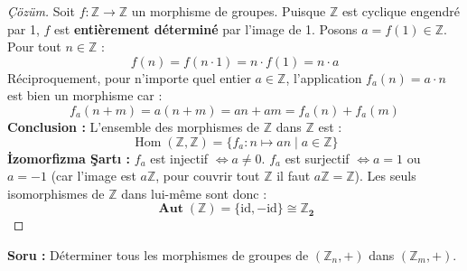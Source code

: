\documentclass[12pt,a4paper]{report}
\begin{document}
\begin{proof}[Çözüm]
Soit $f : \mathbb{Z} \to \mathbb{Z}$ un morphisme de groupes.  
Puisque $\mathbb{Z}$ est cyclique engendré par 1, $f$ est \textbf{entièrement déterminé} par l'image de 1.  
Posons $a = f(1) \in \mathbb{Z}$.  
Pour tout $n \in \mathbb{Z}$ :
\[ f(n) = f(n \cdot 1) = n \cdot f(1) = n \cdot a \]
Réciproquement, pour n'importe quel entier $a \in \mathbb{Z}$, l'application $f_a(n) = a \cdot n$ est bien un morphisme car :
\[ f_a(n + m) = a(n + m) = an + am = f_a(n) + f_a(m) \]
\textbf{Conclusion :} L'ensemble des morphismes de $\mathbb{Z}$ dans $\mathbb{Z}$ est :
\[ \operatorname{Hom}(\mathbb{Z}, \mathbb{Z}) = \{ f_a : n \mapsto an \mid a \in \mathbb{Z} \} \]
\textbf{İzomorfizma Şartı :}  
$f_a$ est injectif $\iff a \neq 0$.  
$f_a$ est surjectif $\iff a = 1$ ou $a = -1$ (car l'image est $a\mathbb{Z}$, pour couvrir tout $\mathbb{Z}$ il faut $a\mathbb{Z} = \mathbb{Z}$).  
Les seuls isomorphismes de $\mathbb{Z}$ dans lui-même sont donc :
\[ \mathbf{\operatorname{Aut}(\mathbb{Z}) = \{ \mathrm{id}, -\mathrm{id} \} \cong \mathbb{Z}_2} \]
\end{proof}

\vspace{0.4cm}

\begin{tcolorbox}[colback=green!5!white,colframe=green!60!black,title=Soru Tipi 3 : $\mathbb{Z}_n$'den $\mathbb{Z}_m$'ye Tüm Morfizmler]
\textbf{Soru :} Déterminer tous les morphismes de groupes de $(\mathbb{Z}_n, +)$ dans $(\mathbb{Z}_m, +)$.
\end{tcolorbox}
\end{document}

